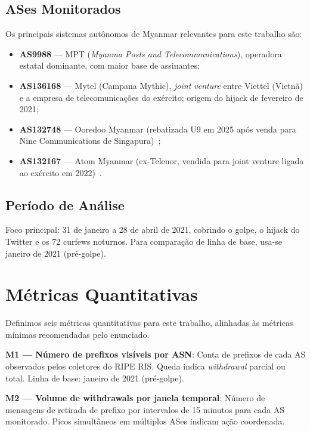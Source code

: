 \documentclass[12pt]{article}
\begin{document}
\subsection{ASes Monitorados}

Os principais sistemas autônomos de Myanmar relevantes para este trabalho são:

\begin{itemize}
  \item \textbf{AS9988} --- MPT (\textit{Myanma Posts and Telecommunications}),
    operadora estatal dominante, com maior base de assinantes;
  \item \textbf{AS136168} --- Mytel (Campana Mythic), \textit{joint venture}
    entre Viettel (Vietnã) e a empresa de telecomunicações do exército;
    origem do hijack de fevereiro de 2021;
  \item \textbf{AS132748} --- Ooredoo Myanmar (rebatizada U9 em 2025 após
    venda para Nine Communications de Singapura)~\cite{dcd:2026};
  \item \textbf{AS132167} --- Atom Myanmar (ex-Telenor, vendida para joint
    venture ligada ao exército em 2022)~\cite{dcd:2026}.
\end{itemize}

\subsection{Período de Análise}

Foco principal: 31 de janeiro a 28 de abril de 2021, cobrindo o golpe, o
hijack do Twitter e os 72 curfews noturnos. Para comparação de linha de base,
usa-se janeiro de 2021 (pré-golpe).


\section{Métricas Quantitativas}

Definimos seis métricas quantitativas para este trabalho, alinhadas às métricas
mínimas recomendadas pelo enunciado.

\textbf{M1 --- Número de prefixos visíveis por ASN}: Conta de prefixos de cada
AS observados pelos coletores do RIPE RIS. Queda indica \textit{withdrawal}
parcial ou total. Linha de base: janeiro de 2021 (pré-golpe).

\textbf{M2 --- Volume de withdrawals por janela temporal}: Número de mensagens
de retirada de prefixo por intervalos de 15 minutos para cada AS monitorado.
Picos simultâneos em múltiplos ASes indicam ação coordenada.
\end{document}
